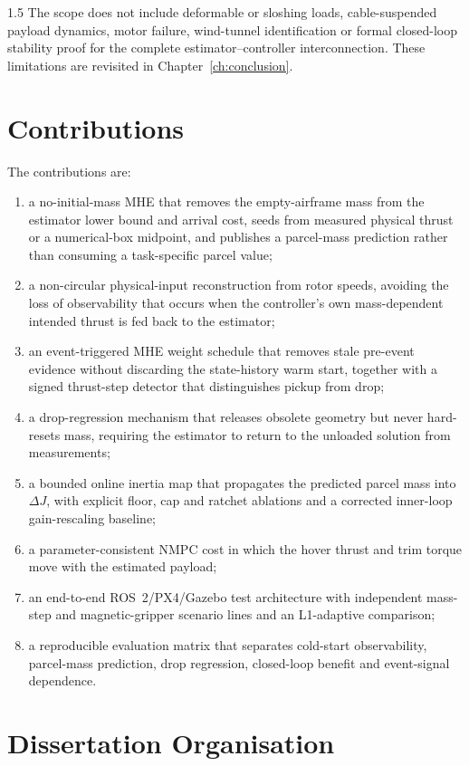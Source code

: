 \begin{spacing}{1.5}
The scope does not include deformable or sloshing loads, cable-suspended payload dynamics, motor failure, wind-tunnel identification or formal closed-loop stability proof for the complete estimator--controller interconnection. These limitations are revisited in Chapter~\ref{ch:conclusion}.

\section{Contributions}

The contributions are:
\begin{enumerate}
    \item a no-initial-mass MHE that removes the empty-airframe mass from the estimator lower bound and arrival cost, seeds from measured physical thrust or a numerical-box midpoint, and publishes a parcel-mass prediction rather than consuming a task-specific parcel value;
    \item a non-circular physical-input reconstruction from rotor speeds, avoiding the loss of observability that occurs when the controller's own mass-dependent intended thrust is fed back to the estimator;
    \item an event-triggered MHE weight schedule that removes stale pre-event evidence without discarding the state-history warm start, together with a signed thrust-step detector that distinguishes pickup from drop;
    \item a drop-regression mechanism that releases obsolete geometry but never hard-resets mass, requiring the estimator to return to the unloaded solution from measurements;
    \item a bounded online inertia map that propagates the predicted parcel mass into $\Delta J$, with explicit floor, cap and ratchet ablations and a corrected inner-loop gain-rescaling baseline;
    \item a parameter-consistent NMPC cost in which the hover thrust and trim torque move with the estimated payload;
    \item an end-to-end ROS~2/PX4/Gazebo test architecture with independent mass-step and magnetic-gripper scenario lines and an L1-adaptive comparison;
    \item a reproducible evaluation matrix that separates cold-start observability, parcel-mass prediction, drop regression, closed-loop benefit and event-signal dependence.
\end{enumerate}

\section{Dissertation Organisation}


\end{spacing}
